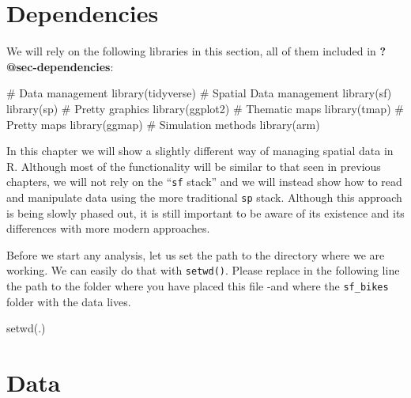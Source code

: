 \documentclass[
  letterpaper,
  krantz2]{style/krantz}
\newenvironment{Shaded}{\begin{snugshade}}{\end{snugshade}}
\newcommand{\CommentTok}[1]{\textcolor[rgb]{0.37,0.37,0.37}{#1}}
\newcommand{\FunctionTok}[1]{\textcolor[rgb]{0.28,0.35,0.67}{#1}}
\newcommand{\NormalTok}[1]{\textcolor[rgb]{0.00,0.23,0.31}{#1}}
\newcommand{\StringTok}[1]{\textcolor[rgb]{0.13,0.47,0.30}{#1}}
\begin{document}
\hypertarget{dependencies-2}{%
\section{Dependencies}\label{dependencies-2}}

We will rely on the following libraries in this section, all of them
included in \textbf{?@sec-dependencies}:

\begin{Shaded}
\begin{Highlighting}[]
\CommentTok{\# Data management}
\FunctionTok{library}\NormalTok{(tidyverse)}
\CommentTok{\# Spatial Data management}
\FunctionTok{library}\NormalTok{(sf)}
\FunctionTok{library}\NormalTok{(sp)}
\CommentTok{\# Pretty graphics}
\FunctionTok{library}\NormalTok{(ggplot2)}
\CommentTok{\# Thematic maps}
\FunctionTok{library}\NormalTok{(tmap)}
\CommentTok{\# Pretty maps}
\FunctionTok{library}\NormalTok{(ggmap)}
\CommentTok{\# Simulation methods}
\FunctionTok{library}\NormalTok{(arm)}
\end{Highlighting}
\end{Shaded}

In this chapter we will show a slightly different way of managing
spatial data in R. Although most of the functionality will be similar to
that seen in previous chapters, we will not rely on the ``\texttt{sf}
stack'' and we will instead show how to read and manipulate data using
the more traditional \texttt{sp} stack. Although this approach is being
slowly phased out, it is still important to be aware of its existence
and its differences with more modern approaches.

Before we start any analysis, let us set the path to the directory where
we are working. We can easily do that with \texttt{setwd()}. Please
replace in the following line the path to the folder where you have
placed this file -and where the \texttt{sf\_bikes} folder with the data
lives.

\begin{Shaded}
\begin{Highlighting}[]
\FunctionTok{setwd}\NormalTok{(}\StringTok{\textquotesingle{}.\textquotesingle{}}\NormalTok{)}
\end{Highlighting}
\end{Shaded}

\hypertarget{data-1}{%
\section{Data}\label{data-1}}
\end{document}
